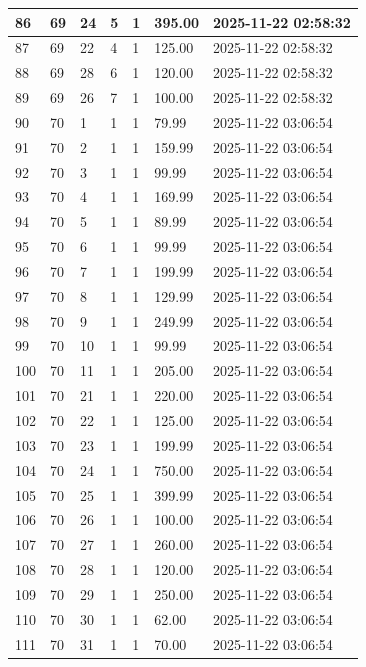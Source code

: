 \begin{longtable}{|l|l|l|l|l|l|l|}
86 & 69 & 24 & 5 & 1 & 395.00 & 2025-11-22 02:58:32 \\ \hline 
87 & 69 & 22 & 4 & 1 & 125.00 & 2025-11-22 02:58:32 \\ \hline 
88 & 69 & 28 & 6 & 1 & 120.00 & 2025-11-22 02:58:32 \\ \hline 
89 & 69 & 26 & 7 & 1 & 100.00 & 2025-11-22 02:58:32 \\ \hline 
90 & 70 & 1 & 1 & 1 & 79.99 & 2025-11-22 03:06:54 \\ \hline 
91 & 70 & 2 & 1 & 1 & 159.99 & 2025-11-22 03:06:54 \\ \hline 
92 & 70 & 3 & 1 & 1 & 99.99 & 2025-11-22 03:06:54 \\ \hline 
93 & 70 & 4 & 1 & 1 & 169.99 & 2025-11-22 03:06:54 \\ \hline 
94 & 70 & 5 & 1 & 1 & 89.99 & 2025-11-22 03:06:54 \\ \hline 
95 & 70 & 6 & 1 & 1 & 99.99 & 2025-11-22 03:06:54 \\ \hline 
96 & 70 & 7 & 1 & 1 & 199.99 & 2025-11-22 03:06:54 \\ \hline 
97 & 70 & 8 & 1 & 1 & 129.99 & 2025-11-22 03:06:54 \\ \hline 
98 & 70 & 9 & 1 & 1 & 249.99 & 2025-11-22 03:06:54 \\ \hline 
99 & 70 & 10 & 1 & 1 & 99.99 & 2025-11-22 03:06:54 \\ \hline 
100 & 70 & 11 & 1 & 1 & 205.00 & 2025-11-22 03:06:54 \\ \hline 
101 & 70 & 21 & 1 & 1 & 220.00 & 2025-11-22 03:06:54 \\ \hline 
102 & 70 & 22 & 1 & 1 & 125.00 & 2025-11-22 03:06:54 \\ \hline 
103 & 70 & 23 & 1 & 1 & 199.99 & 2025-11-22 03:06:54 \\ \hline 
104 & 70 & 24 & 1 & 1 & 750.00 & 2025-11-22 03:06:54 \\ \hline 
105 & 70 & 25 & 1 & 1 & 399.99 & 2025-11-22 03:06:54 \\ \hline 
106 & 70 & 26 & 1 & 1 & 100.00 & 2025-11-22 03:06:54 \\ \hline 
107 & 70 & 27 & 1 & 1 & 260.00 & 2025-11-22 03:06:54 \\ \hline 
108 & 70 & 28 & 1 & 1 & 120.00 & 2025-11-22 03:06:54 \\ \hline 
109 & 70 & 29 & 1 & 1 & 250.00 & 2025-11-22 03:06:54 \\ \hline 
110 & 70 & 30 & 1 & 1 & 62.00 & 2025-11-22 03:06:54 \\ \hline 
111 & 70 & 31 & 1 & 1 & 70.00 & 2025-11-22 03:06:54 \\ \hline 

\end{longtable}
